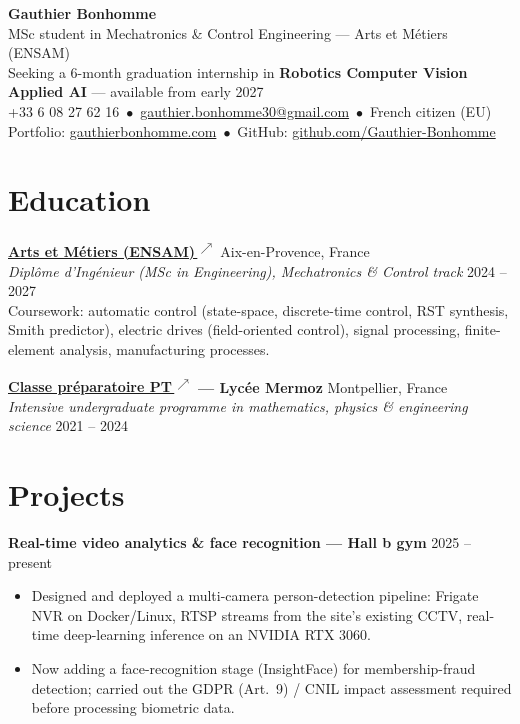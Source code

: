 \documentclass[10pt,a4paper]{article}
\newcommand{\lk}{\,\textsuperscript{$\nearrow$}}
\newcommand{\link}[2]{\href{#1}{#2\lk}}
\begin{document}
\begin{center}
  {\Huge\bfseries Gauthier Bonhomme}\\[0.45em]
  MSc student in Mechatronics \& Control Engineering --- Arts et Métiers (ENSAM)\\[0.15em]
  Seeking a 6-month graduation internship in \textbf{Robotics \textperiodcentered{} Computer Vision \textperiodcentered{} Applied AI} --- available from early 2027\\[0.35em]
  +33 6 08 27 62 16 \,{\scriptsize$\bullet$}\, \href{mailto:gauthier.bonhomme30@gmail.com}{gauthier.bonhomme30@gmail.com} \,{\scriptsize$\bullet$}\, French citizen (EU)\\[0.15em]
  Portfolio: \href{https://gauthierbonhomme.com}{gauthierbonhomme.com} \,{\scriptsize$\bullet$}\, GitHub: \href{https://github.com/Gauthier-Bonhomme}{github.com/Gauthier-Bonhomme}
\end{center}

\section{Education}

\textbf{\link{https://artsetmetiers.fr/}{Arts et Métiers (ENSAM)}} \hfill Aix-en-Provence, France\\
\textit{Diplôme d'Ingénieur (MSc in Engineering), Mechatronics \& Control track} \hfill 2024 -- 2027\\
Coursework: automatic control (state-space, discrete-time control, RST synthesis, Smith predictor), electric drives (field-oriented control), signal processing, finite-element analysis, manufacturing processes.

\vspace{0.35em}
\textbf{\link{https://fr.wikipedia.org/wiki/Classe_pr\%C3\%A9paratoire_physique_et_technologie}{Classe préparatoire PT} --- Lycée Mermoz} \hfill Montpellier, France\\
\textit{Intensive undergraduate programme in mathematics, physics \& engineering science} \hfill 2021 -- 2024

\section{Projects}

\textbf{Real-time video analytics \& face recognition --- Hall b gym} \hfill 2025 -- present
\begin{itemize}
  \item Designed and deployed a multi-camera person-detection pipeline: Frigate NVR on Docker/Linux, RTSP streams from the site's existing CCTV, real-time deep-learning inference on an NVIDIA RTX 3060.
  \item Now adding a face-recognition stage (InsightFace) for membership-fraud detection; carried out the GDPR (Art.~9) / CNIL impact assessment required before processing biometric data.
\end{itemize}
\end{document}
